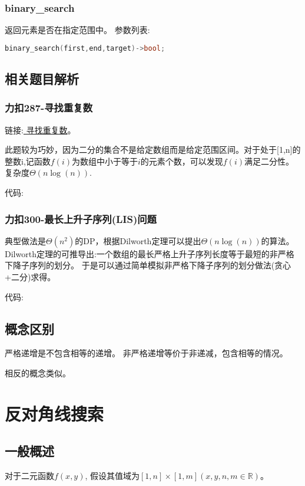 \documentclass{article}
\begin{document}
    \subsubsection{binary\_search}
    返回元素是否在指定范围中。
    参数列表:
    \begin{lstlisting}[language=c++]
        binary_search(first,end,target)->bool;
    \end{lstlisting}

    \subsection{相关题目解析}
    \subsubsection{力扣287-寻找重复数}
    链接:\href{https://leetcode.cn/problems/find-the-duplicate-number/}{ 寻找重复数}。

    此题较为巧妙，因为二分的集合不是给定数组而是给定范围区间。对于处于[1,n]的整数i,记函数$f(i)$为数组中小于等于$i$的元素个数，可以发现$f(i)$满足二分性。复杂度$\Theta(n\log(n))$.

    代码:

    

    \subsubsection{力扣300-最长上升子序列(LIS)问题}
    典型做法是$\Theta(n^2)$的DP，根据Dilworth定理可以提出$\Theta(n\log(n))$的算法。
    Dilworth定理的可推导出:一个数组的最长严格上升子序列长度等于最短的非严格下降子序列的划分。
    于是可以通过简单模拟非严格下降子序列的划分做法(贪心+二分)求得。

    代码:
    
    

    \subsection{概念区别}
    严格递增是不包含相等的递增。
    非严格递增等价于非递减，包含相等的情况。
    
    相反的概念类似。

    \section{反对角线搜索}
    \subsection{一般概述}
    对于二元函数$f(x, y)$, 假设其值域为$[1, n] \times [1, m](x, y, n, m \in \mathbb{R})$。
    
\end{document}
